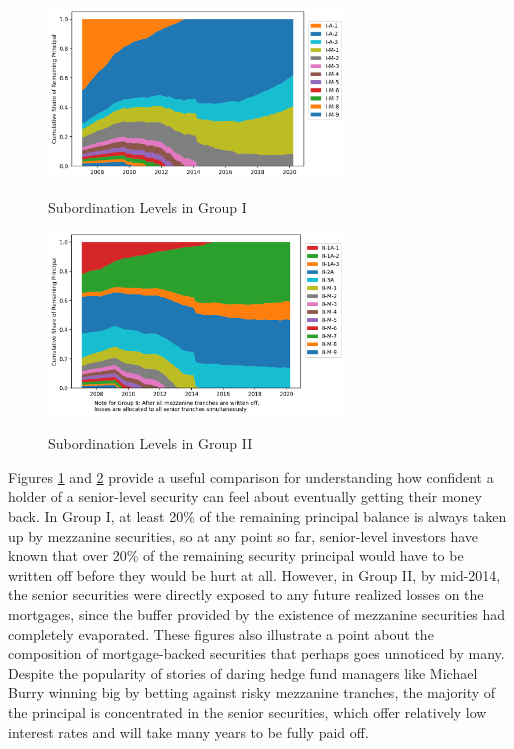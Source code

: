 \documentclass[12pt]{article}
\begin{document}
\begin{figure}[h]
	\centering
	\caption{Subordination Levels in Group I}
	\includegraphics[width=0.7\textwidth]{../figures/stackplot_share_of_principal_group_i}
	\label{fig:stackplot_share_of_principal_group_i}
\end{figure}

\begin{figure}[h]
	\centering
	\caption{Subordination Levels in Group II}
	\includegraphics[width=0.7\textwidth]{../figures/stackplot_share_of_principal_group_ii}
	\label{fig:stackplot_share_of_principal_group_ii}
\end{figure}

Figures \ref{fig:stackplot_share_of_principal_group_i} and \ref{fig:stackplot_share_of_principal_group_ii} provide a useful comparison for understanding how confident a holder of a senior-level security can feel about eventually getting their money back. In Group I, at least 20\% of the remaining principal balance is always taken up by mezzanine securities, so at any point so far, senior-level investors have known that over 20\% of the remaining security principal would have to be written off before they would be hurt at all. However, in Group II, by mid-2014, the senior securities were directly exposed to any future realized losses on the mortgages, since the buffer provided by the existence of mezzanine securities had completely evaporated. These figures also illustrate a point about the composition of mortgage-backed securities that perhaps goes unnoticed by many. Despite the popularity of stories of daring hedge fund managers like Michael Burry winning big by betting against risky mezzanine tranches, the majority of the principal is concentrated in the senior securities, which offer relatively low interest rates and will take many years to be fully paid off.
\end{document}
